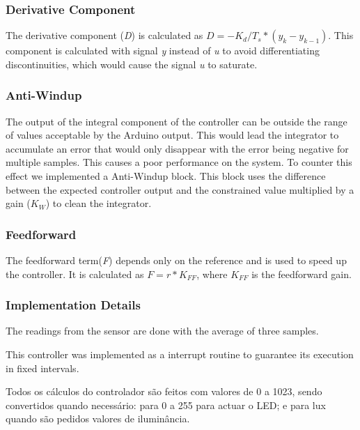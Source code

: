 \subsubsection{Derivative Component}
\label{sub:Derivative Component}

The derivative component (\emph{D}) is calculated as $ D = - K_d/T_s * (y_{k}-y_{k-1})$.
This component is calculated with signal \emph{y} instead of \emph{u} to avoid differentiating discontinuities, which would cause the signal \emph{u} to saturate.

\subsubsection{Anti-Windup}
\label{sub:AntiWindup}

The output of the integral component of the controller can be outside the range of values acceptable by the Arduino output.
This would lead the integrator to accumulate an error that would only disappear with the error being negative for multiple samples.
This causes a poor performance on the system.
To counter this effect we implemented a Anti-Windup block.
This block uses the difference between the expected controller output and the constrained value multiplied by a gain ($K_W$) to clean the integrator.

\subsubsection{Feedforward}
\label{sub:Feedforward}

The feedforward term(\emph{F}) depends only on the reference and is used to speed up the controller. It is calculated as $F = r * K_{FF}$, where $K_{FF}$ is the feedforward gain.

\subsubsection{Implementation Details}
\label{sub:Implementation Details}

The readings from the sensor are done with the average of three samples.

This controller was implemented as a interrupt routine to guarantee its execution in fixed intervals.

Todos os cálculos do controlador são feitos com valores de 0 a 1023, sendo convertidos quando necessário: para 0 a 255 para actuar o LED; e para lux quando são pedidos valores de iluminância.

